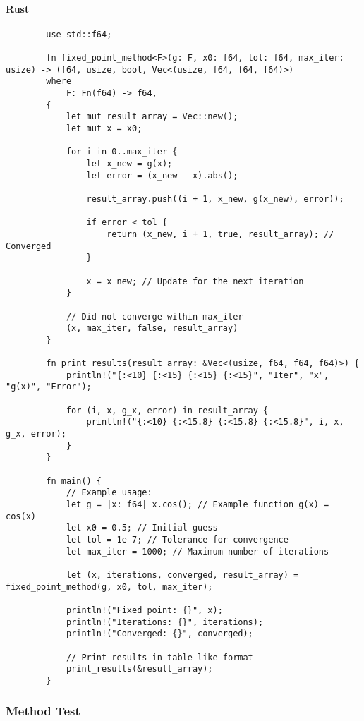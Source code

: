 \documentclass{article}
\begin{document}
    \paragraph{Rust}
    \begin{verbatim}
        use std::f64;

        fn fixed_point_method<F>(g: F, x0: f64, tol: f64, max_iter: usize) -> (f64, usize, bool, Vec<(usize, f64, f64, f64)>)
        where
            F: Fn(f64) -> f64,
        {
            let mut result_array = Vec::new();
            let mut x = x0;

            for i in 0..max_iter {
                let x_new = g(x);
                let error = (x_new - x).abs();

                result_array.push((i + 1, x_new, g(x_new), error));

                if error < tol {
                    return (x_new, i + 1, true, result_array); // Converged
                }

                x = x_new; // Update for the next iteration
            }

            // Did not converge within max_iter
            (x, max_iter, false, result_array)
        }

        fn print_results(result_array: &Vec<(usize, f64, f64, f64)>) {
            println!("{:<10} {:<15} {:<15} {:<15}", "Iter", "x", "g(x)", "Error");

            for (i, x, g_x, error) in result_array {
                println!("{:<10} {:<15.8} {:<15.8} {:<15.8}", i, x, g_x, error);
            }
        }

        fn main() {
            // Example usage:
            let g = |x: f64| x.cos(); // Example function g(x) = cos(x)
            let x0 = 0.5; // Initial guess
            let tol = 1e-7; // Tolerance for convergence
            let max_iter = 1000; // Maximum number of iterations

            let (x, iterations, converged, result_array) = fixed_point_method(g, x0, tol, max_iter);

            println!("Fixed point: {}", x);
            println!("Iterations: {}", iterations);
            println!("Converged: {}", converged);

            // Print results in table-like format
            print_results(&result_array);
        }
    \end{verbatim}
    \subsubsection{Method Test}
\end{document}
